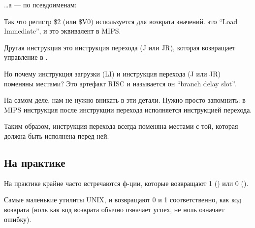 

\dots а \IDA --- по псевдоименам:



Так что регистр \$2 (или \$V0) используется для возврата значений.
 это ``Load Immediate'', и это эквивалент \MOV в MIPS.

Другая инструкция это инструкция перехода (J или JR), которая возвращает управление в .

Но почему инструкция загрузки (LI) и инструкция перехода (J или JR) поменяны местами? Это артефакт \ac{RISC} и называется он ``branch delay slot''.

На самом деле, нам не нужно вникать в эти детали. Нужно просто запомнить: в MIPS инструкция после инструкции перехода исполняется  инструкцией перехода.

Таким образом, инструкция перехода всегда поменяна местами с той, которая должна быть исполнена перед ней.

\subsection{На практике}

На практике крайне часто встречаются ф-ции, которые возвращают 1 () или 0 ().

Самые маленькие утилиты UNIX,  и  возвращают 0 и 1 соответственно, как код возврата
(ноль как код возврата обычно означает успех, не ноль означает ошибку).

